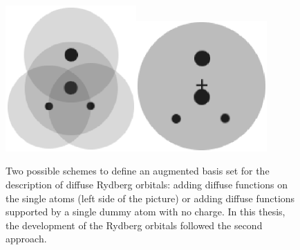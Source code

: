 \begin{center}
\begin{figure}[ht]
\begin{center}
\includegraphics[width=5cm]{03_nevpt/images/rydberg1.eps}\includegraphics[width=5cm]{03_nevpt/images/rydberg2.eps}
\end{center}
\caption{\footnotesize Two possible schemes to define an augmented basis set
for the description of diffuse Rydberg orbitals: adding diffuse functions on
the single atoms (left side of the picture) or adding diffuse functions
supported by a single dummy atom with no charge. In this thesis, the
development of the Rydberg orbitals followed the second approach.}
\label{fig:rydberg}
\end{figure}
\end{center}
